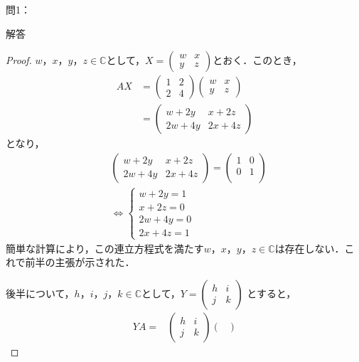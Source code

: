 \documentclass[dvipdfmx,uplatex,11pt]{jsarticle}
\begin{document}
問1：\\
\noindent
\begin{leftbar}
\begin{itembox}[c]{解答}
\begin{proof}
$w，x，y，z \in \mathbb{C}$として，$X=
\begin{pmatrix}
w & x \\
y & z
\end{pmatrix}
$とおく．このとき，
\begin{align}
AX & =
\begin{pmatrix}
1 & 2 \\
2 & 4
\end{pmatrix}
\begin{pmatrix}
w & x \\
y & z
\end{pmatrix}
\\
& = 
\begin{pmatrix}
w + 2y & x + 2z \\
2w + 4y & 2x + 4z
\end{pmatrix}
\end{align}
となり，
\begin{align}
&
\begin{pmatrix}
w + 2y & x +2z \\
2w + 4y & 2x + 4z
\end{pmatrix}
=
\begin{pmatrix}
1 & 0 \\
0 & 1 \\
\end{pmatrix}
\\
&\Leftrightarrow
\begin{cases}
w+2y = 1 \\
x+2z = 0 \\
2w+4y =0 \\
2x+4z=1
\end{cases}
\end{align}
簡単な計算により，この連立方程式を満たす$w，x，y，z \in \mathbb{C}$は存在しない．これで前半の主張が示された．\par
後半について，$h，i，j，k \in \mathbb{C}$として，$Y=
\begin{pmatrix}
h & i \\
j & k
\end{pmatrix}
$
とすると，
\begin{align}
YA=&
\begin{pmatrix}
h & i \\
j & k
\end{pmatrix}
\begin{pmatrix}

\end{pmatrix}
\end{align}
\end{proof}
\end{itembox}
\end{leftbar}
\end{document}
